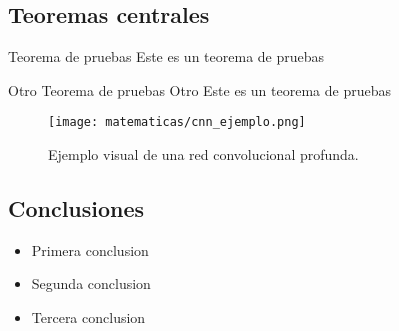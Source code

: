 \subsection{Teoremas centrales}
\begin{frame}
	\begin{block}{Teorema de pruebas}
		Este es un teorema de pruebas
	\end{block}

	\begin{block}{Otro Teorema de pruebas}
		Otro Este es un teorema de pruebas
	\end{block}
\end{frame}

\begin{frame}

	\begin{figure}
		\centering
		\texttt{[image: matematicas/cnn\_ejemplo.png]}
		\caption{Ejemplo visual de una red convolucional profunda.}
	\end{figure}

\end{frame}

\subsection{Conclusiones}
\begin{frame}
	\begin{itemize}
		\item Primera conclusion
		\item Segunda conclusion
		\item Tercera conclusion
	\end{itemize}
\end{frame}
